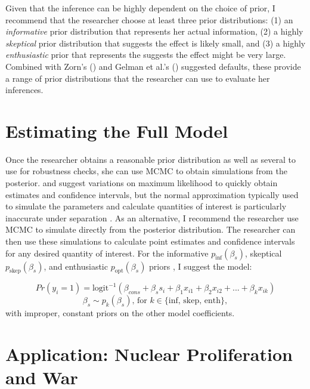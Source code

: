 \documentclass[12pt]{article}
\begin{document}
Given that the inference can be highly dependent on the choice of prior, I recommend that the researcher choose at least three prior distributions: (1) an \emph{informative} prior distribution that represents her actual information, (2) a highly \emph{skeptical} prior distribution that suggests the effect is likely small, and (3) a highly \emph{enthusiastic} prior that represents the suggests the effect might be very large. 
Combined with Zorn's (\citeyear{Zorn2005}) and Gelman et al.'s (\citeyear{Gelmanetal2008}) suggested defaults, these provide a range of prior distributions that the researcher can use to evaluate her inferences.

\section*{Estimating the Full Model}

Once the researcher obtains a reasonable prior distribution as well as several to use for robustness checks, she can use MCMC \citep{Jackman2000} to obtain simulations from the posterior. 
\cite{Zorn2005} and \cite{Gelmanetal2008} suggest variations on maximum likelihood to quickly obtain estimates and confidence intervals, but the normal approximation typically used to simulate the parameters and calculate quantities of interest \citep{KingTomzWittenberg2000} is particularly inaccurate under separation \citep{HeinzeSchemper2002}. 
As an alternative, I recommend the researcher use MCMC to simulate directly from the posterior distribution. 
The researcher can then use these simulations to calculate point estimates and confidence intervals for any desired quantity of interest. 
For the informative $p_{\text{inf}}(\beta_s)$, skeptical $p_{\text{skep}}(\beta_s)$, and enthusiastic $p_{\text{opt}}(\beta_s)$ priors , I suggest the model:

\begin{equation*}
Pr(y_i =1) = \text{logit}^{-1}(\beta_{cons} + \beta_s s_i +  \beta_1 x_{i1} + \beta_2 x_{i2} + ... + \beta_k x_{ik})
\end{equation*}
\begin{equation*}
\beta_s \sim  p_k(\beta_s) \text{, for } k \in \{\text{inf, skep, enth}\},
\end{equation*}
with improper, constant priors on the other model coefficients.

\section*{Application: Nuclear Proliferation and War}
\end{document}
